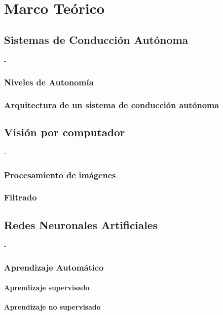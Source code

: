 \chapter{Marco Teórico} \label{ch:m_teorico}

\section{Sistemas de Conducción Autónoma}
-
    \subsection{Niveles de Autonomía}

    \subsection{Arquitectura de un sistema de conducción autónoma}


\section{Visión por computador}
-
    \subsection{Procesamiento de imágenes}
    \subsection{Filtrado}

\section{Redes Neuronales Artificiales}
-
    \subsection{Aprendizaje Automático}
        \subsubsection{Aprendizaje supervisado}
        \subsubsection{Aprendizaje no supervisado}
